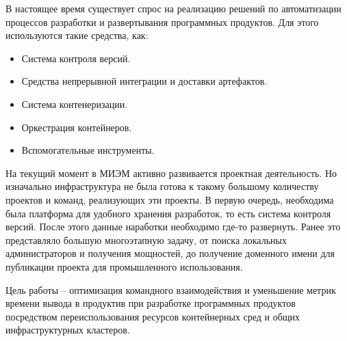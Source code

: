\Introduction

В настоящее время существует спрос на реализацию решений по автоматизации процессов разработки и развертывания программных продуктов. Для этого используются такие средства, как:

\begin{itemize}
    \item Система контроля версий.
    \item Средства непрерывной интеграции и доставки артефактов.
    \item Система контенеризации.
    \item Оркестрация контейнеров.
    \item Вспомогательные инструменты.
\end{itemize}

На текущий момент в МИЭМ активно развивается проектная деятельность. Но изначально инфраструктура не была готова к такому большому количеству проектов и команд, реализующих эти проекты. В первую очередь, необходима была платформа для удобного хранения разработок, то есть система контроля версий. После этого данные наработки необходимо где-то развернуть. Ранее это представляло большую многоэтапную задачу, от поиска локальных администраторов и получения мощностей, до получение доменного имени для публикации проекта для промышленного использования.

Цель работы -- оптимизация командного взаимодействия и уменьшение метрик времени вывода в продуктив при разработке программных продуктов посредством переиспользования ресурсов контейнерных сред и общих инфраструктурных кластеров.
